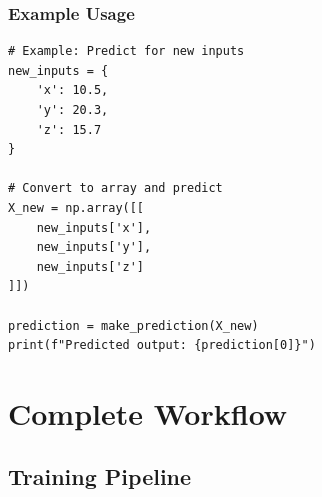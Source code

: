 \documentclass[11pt,a4paper]{article}
\begin{document}
\subsubsection{Example Usage}

\begin{lstlisting}
# Example: Predict for new inputs
new_inputs = {
    'x': 10.5,
    'y': 20.3,
    'z': 15.7
}

# Convert to array and predict
X_new = np.array([[
    new_inputs['x'],
    new_inputs['y'],
    new_inputs['z']
]])

prediction = make_prediction(X_new)
print(f"Predicted output: {prediction[0]}")
\end{lstlisting}

\newpage
\section{Complete Workflow}

\subsection{Training Pipeline}
\end{document}
